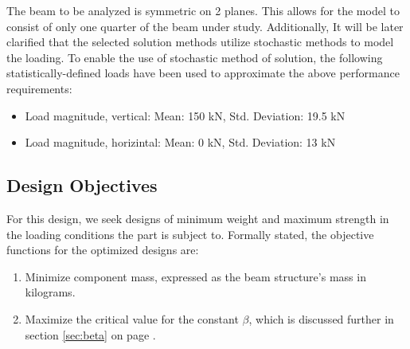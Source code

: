 The beam to be analyzed is symmetric on 2 planes. This allows for the model to consist of only one quarter of the beam under study. Additionally, It will be later clarified that the selected solution methods utilize stochastic methods to model the loading. To enable the use of stochastic method of solution, the following statistically-defined loads have been used to approximate the above performance requirements: 

\begin{itemize}
\item Load magnitude, vertical:   Mean: 150 kN, Std. Deviation: 19.5 kN
\item Load magnitude, horizintal: Mean: 0   kN, Std. Deviation: 13 kN
\end{itemize}

\subsection{Design Objectives}
For this design, we seek designs of minimum weight and maximum strength in the loading conditions the part is subject to. Formally stated, the objective functions for the optimized designs are: 

\begin{enumerate}
\item Minimize component mass, expressed as the beam structure's mass in kilograms. 
\item Maximize the critical value for the constant $\beta$, which is discussed further in section \ref{sec:beta} on page \pageref{sec:beta}.
\end{enumerate}
